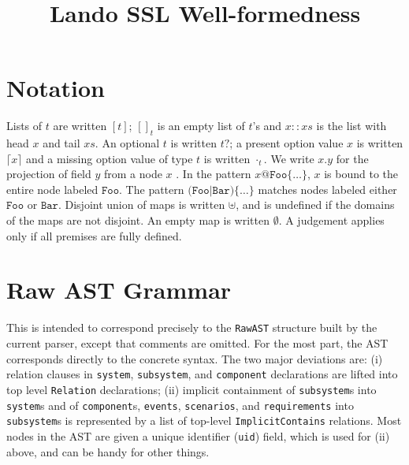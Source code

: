 \documentclass{article}
\begin{document}
\title{Lando SSL Well-formedness}
\maketitle

\section{Notation}

\newcommand{\nt}[1]{\ensuremath{\mathit{#1}}}
\newcommand{\lab}[1]{\ensuremath{\texttt{#1}}}
\newcommand{\listof}[1]{\ensuremath{[{#1}]}}
\newcommand{\nillist}[1]{[]_{#1}}
\newcommand{\conslist}[2]{{#1}::{#2}}
\newcommand{\optof}[1]{\ensuremath{{#1}?}}
\newcommand{\some}[1]{\lceil{#1}\rceil}
\newcommand{\none}[1]{\cdot_{#1}}
\newcommand{\proj}[2]{\ensuremath{{#1}.{#2}}}
\newcommand{\emptym}{\emptyset} 

Lists of $t$ are written $\listof{t}$; $\nillist{t}$ is an empty list of $t$'s and $\conslist{x}{xs}$ is the list with head $x$ and tail $xs$.
An optional $t$ is written $\optof{t}$; a present option value $x$ is written $\some{x}$ and a missing option value of type $t$ is written $\none{t}$.
We write $\proj{x}{y}$ for the projection of field $y$ from a node $x$ .
In the pattern $x@\lab{Foo}\{\ldots\}$, $x$ is bound to the entire node labeled $\lab{Foo}$.
The pattern $\lab{(Foo|Bar)}\{\ldots\}$ matches nodes labeled either $\lab{Foo}$ or $\lab{Bar}$.
Disjoint union of maps is written $\uplus$, and is undefined if the domains of the maps are not disjoint.  An empty map is written $\emptym$.
A judgement applies only if all premises are fully defined.
\section{Raw AST Grammar}

This is intended to correspond precisely to the {\tt RawAST} structure built by the current parser, except that comments are omitted.
For the most part, the AST corresponds directly to the concrete syntax.
The two major deviations are: (i) relation clauses in {\tt system}, {\tt subsystem}, and
{\tt component} declarations are lifted into top level {\tt Relation} declarations; (ii) implicit containment of {\tt subsystem}s into
{\tt system}s and of {\tt component}s, {\tt events}, {\tt scenarios}, and {\tt requirements} into {\tt subsystem}s is represented by a list of top-level {\tt ImplicitContains} relations.
Most nodes in the AST are given a unique identifier ({\tt uid}) field, which is used for (ii) above, and can be handy for other things.
\end{document}
